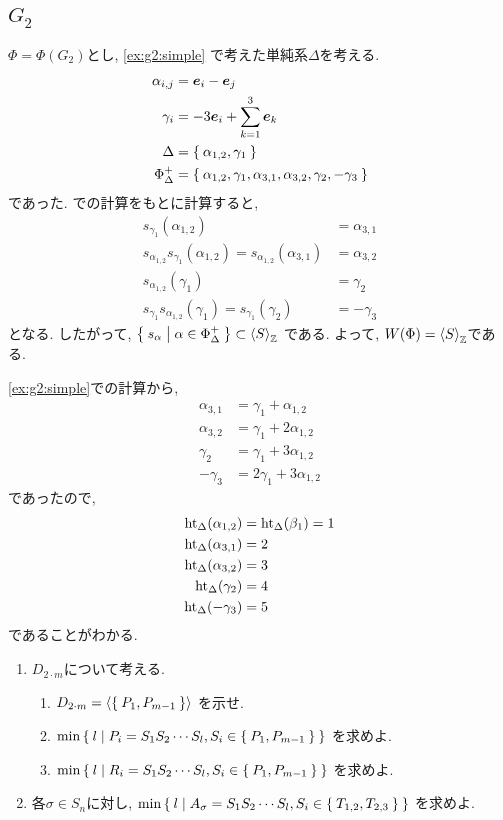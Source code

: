 \subsection{$G_2$}
$\Phi=\Phi(G_2)$とし,
\cref{ex:g2:simple}
で考えた単純系$\Delta$を考える.
\begin{align*}
  \alpha_{i,j}&=\boldsymbol{e}_i-\boldsymbol{e}_j\\
  \gamma_{i}&=-3\boldsymbol{e}_i+\sum_{k=1}^{3}\boldsymbol{e}_k\\
  \Delta&=\Set{\alpha_{1,2},\gamma_{1}}\\
  \Phi_\Delta^+ 
&=\Set{ \alpha_{1,2},\gamma_{1}, \alpha_{3,1},\alpha_{3,2},\gamma_{2},-\gamma_3}
\end{align*}
であった. での計算をもとに計算すると,
\begin{align*}
  s_{\gamma_{1}}(\alpha_{1,2})&=\alpha_{3,1}\\
  s_{\alpha_{1,2}}s_{\gamma_{1}}(\alpha_{1,2})=
  s_{\alpha_{1,2}}(\alpha_{3,1})&=\alpha_{3,2}\\
  s_{\alpha_{1,2}}(\gamma_1)&=\gamma_{2}\\
  s_{\gamma_{1}}s_{\alpha_{1,2}}(\gamma_1)=
  s_{\gamma_{1}}(\gamma_2)&=-\gamma_{3}
\end{align*}
となる.  したがって, $\Set{s_\alpha |\alpha\in\Phi_\Delta^+}\subset\Braket{S}_{\mathbb{Z}}$
である.
よって, $W(\Phi)=\Braket{S}_{\mathbb{Z}}$である.


\cref{ex:g2:simple}での計算から,
\begin{align*}
\alpha_{3,1}&=  \gamma_{1}+\alpha_{1,2}\\
\alpha_{3,2}&=  \gamma_{1}+2\alpha_{1,2}\\
\gamma_{2}&= \gamma_{1}+3\alpha_{1,2}\\
-\gamma_3&= 2\gamma_{1}+3\alpha_{1,2}
\end{align*}
であったので,
\begin{align*}
  \operatorname{ht}_\Delta(\alpha_{1,2})&=\operatorname{ht}_\Delta(\beta_{1})=1\\
  \operatorname{ht}_\Delta(\alpha_{3,1})&=  2\\
  \operatorname{ht}_\Delta(\alpha_{3,2})&=  3\\
  \operatorname{ht}_\Delta(\gamma_{2})&= 4\\
  \operatorname{ht}_\Delta(-\gamma_3)&= 5
\end{align*}
であることがわかる.

\begin{enumerate}
\item
  $D_{2\cdot m}$について考える.
  \begin{enumerate}
  \item
    $D_{2\cdot m}=\Braket{\Set{P_1,P_{m-1}}}$
    を示せ.
  \item
    $\min\Set{l|P_i=S_1S_2\cdots S_l, S_i\in \Set{P_1,P_{m-1}}}$
    を求めよ.
  \item
    $\min\Set{l|R_i=S_1S_2\cdots S_l, S_i\in \Set{P_1,P_{m-1}}}$
    を求めよ.
  \end{enumerate}
\item 各$\sigma\in S_n$に対し,
    $\min\Set{l|A_\sigma=S_1S_2\cdots S_l, S_i\in \Set{T_{1,2},T_{2,3}}}$
    を求めよ.  
\end{enumerate}

